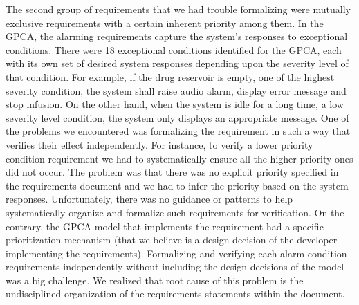The second group of requirements that we had trouble formalizing were mutually exclusive requirements with a certain inherent priority among them. In the GPCA, the alarming requirements capture the system's responses to exceptional conditions. There were 18 exceptional conditions identified for the GPCA, each with its own set of desired system responses depending upon the severity level of that condition. For example, if the drug reservoir is empty, one of the highest severity condition, the system shall raise audio alarm, display error message and stop infusion. On the other hand, when the system is idle for a long time, a low severity level condition, the system only displays an appropriate message. One of the problems we encountered was formalizing the requirement in such a way that verifies their effect independently. For instance, to verify a lower priority condition requirement we had to systematically ensure all the higher priority ones did not occur. The problem was that there was no explicit priority specified in the requirements document and we had to infer the priority based on the system responses. Unfortunately, there was no guidance or patterns to help systematically organize and formalize such requirements for verification. On the contrary, the GPCA model that implements the requirement had a specific prioritization mechanism (that we believe is a design decision of the developer implementing the requirements). Formalizing and verifying each alarm condition requirements independently without including the design decisions of the model was a big challenge. We realized that root cause of this problem is the undisciplined organization of the requirements statements within the document.
